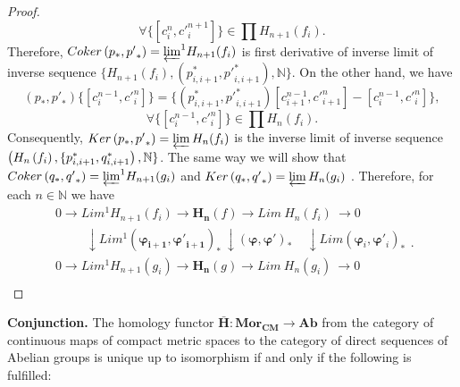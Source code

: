 \documentclass[10pt]{article}
\theoremstyle{definition}
\begin{document}
\begin{proof}
$$ \forall  {\lbrace \left[ c_{i}^n, {c'}_{i}^{n+1} \right] \rbrace}  \in \prod H_{n+1}(f_i).$$
Therefore, $Coker \left( p_{*}, {p'}_{*} \right)={\varprojlim}^{1} H_{n+1}(f_{i})$  is first derivative of inverse limit of inverse sequence $\{ H_{n+1} \left( f_i \right) , \left(p_{i,i+1}^{*}, {p'}_{i,i+1}^{*} \right) , \mathbb{N} \} $. 
On the other hand, we have
$$
\left( p_{*},{p'}_{*} \right) \lbrace \left[ c_i^{n-1},{c'}_i^n \right] \rbrace=\lbrace \left( p_{i,i+1}^{*}, {p'}_{i,i+1}^{*} \right) \left[ c_{i+1}^{n-1}, {c'}_{i+1}^n \right] - \left[ c_{i}^{n-1}, {c'}_{i}^n \right] \rbrace,$$
$$ \forall  {\lbrace \left[ c_{i}^{n-1}, {c'}_{i}^n \right] \rbrace}  \in \prod H_{n}(f_i).$$
Consequently, $Ker \left( p_{*}, {p'}_{*} \right) = \varprojlim H_{n}(f_{i})$ is the inverse limit of inverse sequence $ \left( H_{n} \left( f_i \right) , \\ 
\{ p_{i,i+1}^{*}, q_{i,i+1}^{*} \right), \mathbb{N} \} $. The same way we will show that $Coker \left( q_{*}, {q'}_{*} \right)={\varprojlim}^{1} H_{n+1}(g_{i})$ and $Ker \left( q_{*}, {q'}_{*} \right) = \varprojlim H_{n}(g_{i})$ . Therefore, for each $n\in \mathbb{N}$ we have
$$
\begin{matrix}
   0\to Li{{m}^{1}}{{H}_{n+1}}( {{f}_{i}} )\to {{\mathbf{H}}_{\mathbf{n}}}( f )\to Lim~{{H}_{n}}( {{f}_{i}} )~\to 0  \\
   ~~~~~~~~~~~\downarrow Li{{m}^{1}} \left( {{\mathbf{\varphi_{i+1} }}},\mathbf{{\varphi'}_{i+1} } \right)_{*}~\downarrow \left( {{\mathbf{\varphi }}},\mathbf{{\varphi}' } \right)_{*}~~~~~\downarrow Lim \left( {{\mathbf{\varphi }}}_{i},{\mathbf{{\varphi}'}_{i} } \right)_{*} \\
   0\to Li{{m}^{1}}{{H}_{n+1}}( {{g}_{i}} )\to {{\mathbf{H}}_{\mathbf{n}}}( g )\to Lim~{{H}_{n}}( {{g}_{i}} )~\to 0  \\
\end{matrix}
.$$



\end{proof}




{\bf Conjunction.}  The homology functor  $\mathbf{\bar{H}}: \mathbf{Mo{{r}_{CM}}}\to \mathbf{Ab}$ from the category of continuous maps of compact metric spaces to the category of direct sequences of Abelian groups is unique up to isomorphism if and only if the following is fulfilled:
\end{document}
